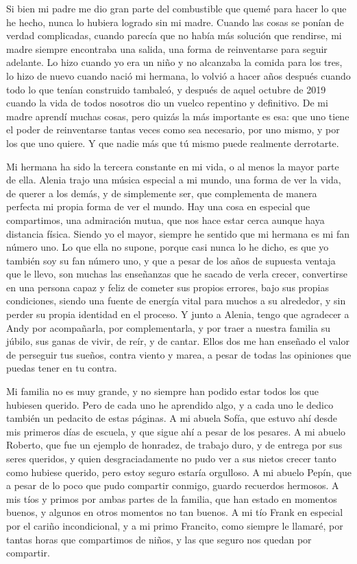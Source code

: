 Si bien mi padre me dio gran parte del combustible que quemé para hacer lo que he hecho, nunca lo hubiera logrado sin mi madre.
Cuando las cosas se ponían de verdad complicadas, cuando parecía que no había más solución que rendirse, mi madre siempre encontraba una salida, una forma de reinventarse para seguir adelante.
Lo hizo cuando yo era un niño y no alcanzaba la comida para los tres, lo hizo de nuevo cuando nació mi hermana, lo volvió a hacer años después cuando todo lo que tenían construido tambaleó, y después de aquel octubre de 2019 cuando la vida de todos nosotros dio un vuelco repentino y definitivo.
De mi madre aprendí muchas cosas, pero quizás la más importante es esa: que uno tiene el poder de reinventarse tantas veces como sea necesario, por uno mismo, y por los que uno quiere.
Y que nadie más que tú mismo puede realmente derrotarte.

Mi hermana ha sido la tercera constante en mi vida, o al menos la mayor parte de ella.
Alenia trajo una música especial a mi mundo, una forma de ver la vida, de querer a los demás, y de simplemente ser, que complementa de manera perfecta mi propia forma de ver el mundo.
Hay una cosa en especial que compartimos, una admiración mutua, que nos hace estar cerca aunque haya distancia física.
Siendo yo el mayor, siempre he sentido que mi hermana es mi fan número uno.
Lo que ella no supone, porque casi nunca lo he dicho, es que yo también soy su fan número uno, y que a pesar de los años de supuesta ventaja que le llevo, son muchas las enseñanzas que he sacado de verla crecer, convertirse en una persona capaz y feliz de cometer sus propios errores, bajo sus propias condiciones, siendo una fuente de energía vital para muchos a su alrededor, y sin perder su propia identidad en el proceso.
Y junto a Alenia, tengo que agradecer a Andy por acompañarla, por complementarla, y por traer a nuestra familia su júbilo, sus ganas de vivir, de reír, y de cantar.
Ellos dos me han enseñado el valor de perseguir tus sueños, contra viento y marea, a pesar de todas las opiniones que puedas tener en tu contra.

Mi familia no es muy grande, y no siempre han podido estar todos los que hubiesen querido. Pero de cada uno he aprendido algo, y a cada uno le dedico también un pedacito de estas páginas.
A mi abuela Sofía, que estuvo ahí desde mis primeros días de escuela, y que sigue ahí a pesar de los pesares.
A mi abuelo Roberto, que fue un ejemplo de honradez, de trabajo duro, y de entrega por sus seres queridos, y quien desgraciadamente no pudo ver a sus nietos crecer tanto como hubiese querido, pero estoy seguro estaría orgulloso.
A mi abuelo Pepín, que a pesar de lo poco que pudo compartir conmigo, guardo recuerdos hermosos. A mis tíos y primos por ambas partes de la familia, que han estado en momentos buenos, y algunos en otros momentos no tan buenos.
A mi tío Frank en especial por el cariño incondicional, y a mi primo Francito, como siempre le llamaré, por tantas horas que compartimos de niños, y las que seguro nos quedan por compartir.

